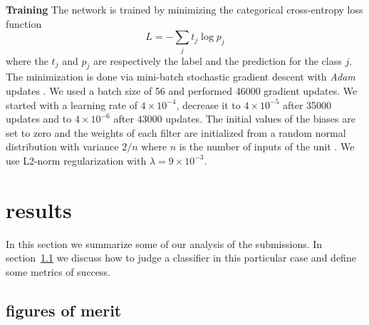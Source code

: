 \documentclass{aa}
\begin{document}
{\bf Training}
The network is trained by minimizing the categorical cross-entropy loss function
\begin{equation}
L = -\sum_j t_{j}\log p_{j}
\label{EQloss}
\end{equation}
where the $t_j$ and $p_j$ are respectively the label and the prediction for the class $j$. 
The minimization is done via mini-batch stochastic gradient descent with \textit{Adam} updates \citep{Kingma_2014}. We used a batch size of 56 and performed  46000 gradient updates. We started with a learning rate of $4 \times 10^{-4}$, decrease it to $4 \times 10^{-5}$ after 35000 updates and to $4 \times 10^{-6}$ after 43000 updates.
The initial values of the biases are set to zero and the weights of each filter are initialized from a random normal distribution with variance ${2/n}$ where $n$ is the number of inputs of the unit \citep{He2015a}.  
We use L2-norm regularization with $\lambda= 9 \times 10^{-3}$.

\section{results}
\label{sec:results}

In this section we summarize some of our analysis of the submissions.  In section~\ref{sec:figure_of_merit} we discuss how to judge a classifier in this particular case and define some metrics of success.

\subsection{figures of merit}
\label{sec:figure_of_merit}
\end{document}
